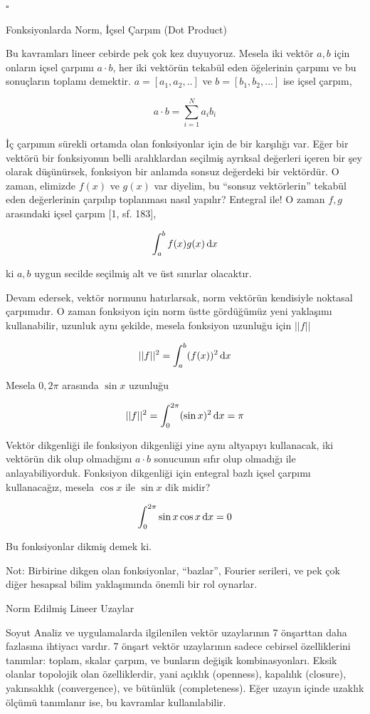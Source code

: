 \documentclass[12pt,fleqn]{article}\usepackage{../../common}
\begin{document}
$\square$

Fonksiyonlarda Norm, İçsel Çarpım (Dot Product)

Bu kavramları lineer cebirde pek çok kez duyuyoruz. Mesela iki vektör
$a,b$ için onların içsel çarpımı $a \cdot b$, her iki vektörün tekabül
eden öğelerinin çarpımı ve bu sonuçların toplamı demektir. $a = [a_1,a_2,..]$
ve $b = [b_1,b_2,...]$ ise içsel çarpım,

$$
a \cdot b = \sum_{i=1}^{N} a_i b_i 
$$

İç çarpımın sürekli ortamda olan fonksiyonlar için de bir karşılığı var.  Eğer
bir vektörü bir fonksiyonun belli aralıklardan seçilmiş ayrıksal değerleri
içeren bir şey olarak düşünürsek, fonksiyon bir anlamda sonsuz değerdeki bir
vektördür. O zaman, elimizde $f(x)$ ve $g(x)$ var diyelim, bu ``sonsuz
vektörlerin'' tekabül eden değerlerinin çarpılıp toplanması nasıl yapılır?
Entegral ile! O zaman $f,g$ arasındaki içsel çarpım [1, sf. 183],

$$
\int_{a}^{b} f(x) g(x) \,\mathrm{d} x
$$

ki $a,b$ uygun secilde seçilmiş alt ve üst sınırlar olacaktır. 

Devam edersek, vektör normunu hatırlarsak, norm vektörün kendisiyle noktasal
çarpımıdır. O zaman fonksiyon için norm üstte gördüğümüz yeni yaklaşımı
kullanabilir, uzunluk aynı şekilde, mesela fonksiyon uzunluğu için $||f||$

$$
||f||^2 = \int_{a}^{b} (f(x))^2 \,\mathrm{d} x
$$

Mesela $0,2\pi$ arasında $\sin x$ uzunluğu

$$
||f||^2 = \int_{0}^{2\pi} (\sin x)^2 \,\mathrm{d} x = \pi
$$

Vektör dikgenliği ile fonksiyon dikgenliği yine aynı altyapıyı kullanacak, iki
vektörün dik olup olmadığını $a \cdot b$ sonucunun sıfır olup olmadığı ile
anlayabiliyorduk. Fonksiyon dikgenliği için entegral bazlı içsel çarpımı
kullanacağız, mesela $\cos x$ ile $\sin x$ dik midir?

$$
\int_{0}^{2\pi} \sin x \cos x \,\mathrm{d} x = 0
$$

Bu fonksiyonlar dikmiş demek ki.

Not: Birbirine dikgen olan fonksiyonlar, ``bazlar'', Fourier serileri, ve pek
çok diğer hesapsal bilim yaklaşımında önemli bir rol oynarlar.


Norm Edilmiş Lineer Uzaylar

Soyut Analiz ve uygulamalarda ilgilenilen vektör uzaylarının 7 önşarttan
daha fazlasına ihtiyacı vardır. 7 önşart vektör uzaylarının sadece cebirsel
özelliklerini tanımlar: toplam, skalar çarpım, ve bunların değişik
kombinasyonları. Eksik olanlar topolojik olan özelliklerdir, yani açıklık
(openness), kapalılık (closure), yakınsaklık (convergence), ve bütünlük
(completeness). Eğer uzayın içinde uzaklık ölçümü tanımlanır ise, bu
kavramlar kullanılabilir. 
\end{document}
